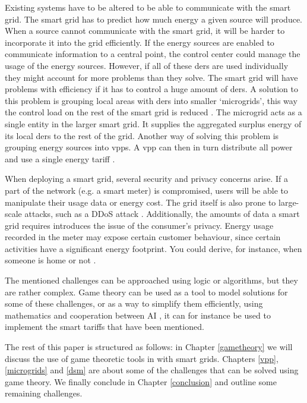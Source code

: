 Existing systems have to be altered to be able to communicate with the smart grid. The smart grid has to predict how much energy a given source will produce. When a source cannot communicate with the smart grid, it will be harder to incorporate it into the grid efficiently. If the energy sources are enabled to communicate information to a central point, the control center could manage the usage of the energy sources. However, if all of these \acp{der} are used individually they might account for more problems than they solve. The smart grid will have problems with efficiency if it has to control a huge amount of \acp{der}. A solution to this problem is grouping local areas with \acp{der} into smaller `microgrids', this way the control load on the rest of the smart grid is reduced \cite{HatziargyriouAsanoIravaniMarnay2007}. The microgrid acts as a single entity in the larger smart grid. It supplies the aggregated surplus energy of its local \acp{der} to the rest of the grid. Another way of solving this problem is grouping energy sources into \acp{vpp}. A \ac{vpp} can then in turn distribute all power and use a single energy tariff \cite{NikonowiczMilewski2012}.

When deploying a smart grid, several security and privacy concerns arise.  If a part of the network (e.g. a smart meter) is compromised, users will be able to manipulate their usage data or energy cost. The grid itself is also prone to large-scale attacks, such as a DDoS attack \cite{McDanielMcLaughlin2009a}. Additionally, the amounts of data a smart grid requires introduces the issue of the consumer's privacy. Energy usage recorded in the meter may expose certain customer behaviour, since certain activities have a significant energy footprint. You could derive, for instance, when someone is home or not \cite{Molina-MarkhamShenoyFuEtAl2010}.

The mentioned challenges can be approached using logic or algorithms, but they are rather complex. Game theory can be used as a tool to model solutions for some of these challenges, or as a way to simplify them efficiently, using mathematics and cooperation between AI \cite{myerson2013game}, it can for instance be used to implement the smart tariffs that have been mentioned. 

The rest of this paper is structured as follows: in Chapter \ref{gametheory} we will discuss the use of game theoretic tools in with smart grids. Chapters \ref{vpp}, \ref{microgrids} and \ref{dsm} are about some of the challenges that can be solved using game theory. We finally conclude in Chapter \ref{conclusion} and outline some remaining challenges.